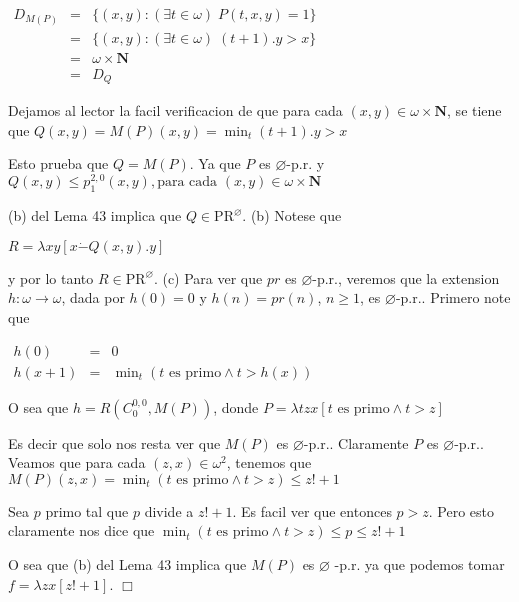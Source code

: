 \(\displaystyle \begin{array}{rcl} D_{M(P)} & =& \{(x,y):(\exists t\in \omega )\;P(t,x,y)=1\} \\ & =& \{(x,y):(\exists t\in \omega )\;(t+1).y >x\} \\ & =& \omega \times \mathbf{N} \\ & =& D_{Q} \end{array} \)

Dejamos al lector la facil verificacion de que para cada \((x,y)\in \omega \times \mathbf{N}\), se tiene que
\(\displaystyle Q(x,y)=M(P)(x,y)=\min_{t}(t+1).y >x \)

Esto prueba que \(Q=M(P)\). Ya que \(P\) es \(\varnothing \)-p.r. y
\(\displaystyle Q(x,y)\leq p_{1}^{2,0}(x,y),\text{para cada }(x,y)\in \omega \times \mathbf{N } \)

(b) del Lema 43 implica que \(Q\in \mathrm{PR}^{\varnothing }\).
(b) Notese que

\(\displaystyle R=\lambda xy\left[ x\dot{-}Q(x,y).y\right] \)

y por lo tanto \(R\in \mathrm{PR}^{\varnothing }\).
(c) Para ver que \(pr\) es \(\varnothing \)-p.r., veremos que la extension \( h:\omega \rightarrow \omega \), dada por \(h(0)=0\) y \(h(n)=pr(n)\), \(n\geq 1\), es \(\varnothing \)-p.r.. Primero note que

\(\displaystyle \begin{array}{rcl} h(0) & =& 0 \\ h(x+1) & =& \min\nolimits_{t}\left( t\text{ es primo}\wedge t >h(x)\right) \end{array} \)

O sea que \(h=R\left( C_{0}^{0,0},M(P)\right) \), donde
\(\displaystyle P=\lambda tzx\left[ t\text{ es primo}\wedge t >z\right] \)

Es decir que solo nos resta ver que \(M(P)\) es \(\varnothing \)-p.r.. Claramente \( P\) es \(\varnothing \)-p.r.. Veamos que para cada \((z,x)\in \omega ^{2}\), tenemos que
\(\displaystyle M(P)(z,x)=\min\nolimits_{t}\left( t\text{ es primo}\wedge t >z\right) \leq z!+1 \)

Sea \(p\) primo tal que \(p\) divide a \(z!+1\). Es facil ver que entonces \(p >z\). Pero esto claramente nos dice que
\(\displaystyle \min\nolimits_{t}\left( t\text{ es primo}\wedge t >z\right) \leq p\leq z!+1 \)

O sea que (b) del Lema 43 implica que \(M(P)\) es \(\varnothing \) -p.r. ya que podemos tomar \(f=\lambda zx\left[ z!+1\right] \). \(\Box\)



